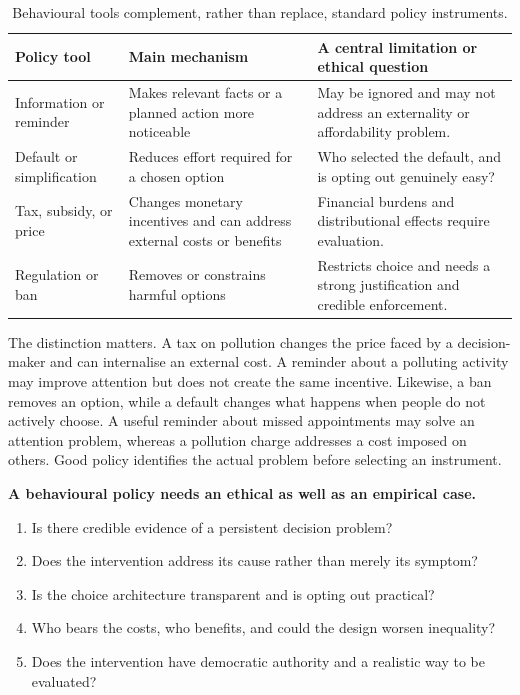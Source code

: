 \begin{table}[htbp]
  \centering
  \small
  \renewcommand{\arraystretch}{1.18}
  \begin{tabular}{@{}p{2.40cm}p{3.60cm}p{4.60cm}@{}}
    \toprule
    Policy tool & Main mechanism & A central limitation or ethical question\\
    \midrule
    Information or reminder & Makes relevant facts or a planned action more noticeable & May be ignored and may not address an externality or affordability problem.\\
    Default or simplification & Reduces effort required for a chosen option & Who selected the default, and is opting out genuinely easy?\\
    Tax, subsidy, or price & Changes monetary incentives and can address external costs or benefits & Financial burdens and distributional effects require evaluation.\\
    Regulation or ban & Removes or constrains harmful options & Restricts choice and needs a strong justification and credible enforcement.\\
    \bottomrule
  \end{tabular}
  \caption{Behavioural tools complement, rather than replace, standard policy
  instruments.}
  \label{tab:behavioural-policy-tools}
\end{table}
\FloatBarrier

The distinction matters. A tax on pollution changes the price faced by a
decision-maker and can internalise an external cost. A reminder about a
polluting activity may improve attention but does not create the same
incentive. Likewise, a ban removes an option, while a default changes what
happens when people do not actively choose. A useful reminder about missed
appointments may solve an attention problem, whereas a pollution charge
addresses a cost imposed on others. Good policy identifies the actual problem
before selecting an instrument.

\begin{keyidea}
\textbf{A behavioural policy needs an ethical as well as an empirical case.}
\begin{enumerate}
  \item Is there credible evidence of a persistent decision problem?
  \item Does the intervention address its cause rather than merely its symptom?
  \item Is the choice architecture transparent and is opting out practical?
  \item Who bears the costs, who benefits, and could the design worsen inequality?
  \item Does the intervention have democratic authority and a realistic way to be evaluated?
\end{enumerate}
\end{keyidea}

